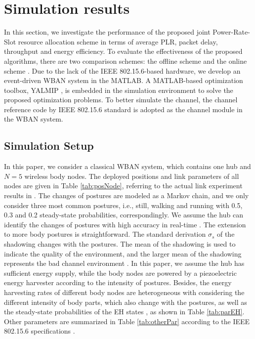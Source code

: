 \documentclass[journal,10pt]{IEEEtran}
\begin{document}
\section{Simulation results} \label{sec:simulation}
In this section, we investigate the performance of the proposed joint Power-Rate-Slot resource allocation scheme in terms of average PLR, packet delay, throughput and energy efficiency.
To evaluate the effectiveness of the proposed algorithms, there are two comparison schemes: the offline scheme \cite{huang2014optimal} and the online scheme \cite{ibarra2016qos}.
Due to the lack of the IEEE 802.15.6-based hardware, we develop an event-driven WBAN system in the MATLAB. A MATLAB-based optimization toolbox, YALMIP \cite{lofberg2004yalmip}, is embedded in the simulation environment to solve the proposed optimization problems. To better simulate the channel, the channel reference code by IEEE 802.15.6 standard \cite{yazdandoost2009channel} is adopted as the channel module in the WBAN system.

\subsection{Simulation Setup}
In this paper, we consider a classical WBAN system, which contains one hub and $N=5$ wireless body nodes. The deployed positions and link parameters of all nodes are given in Table \ref{tab:posNode}, referring to the actual link experiment results in \cite{d2010statistical} \cite{reusens2009characterization}. The changes of postures are modeled as a Markov chain, and we only consider three most common postures, i.e., still, walking and running with 0.5, 0.3 and 0.2 steady-state probabilities, correspondingly. We assume the hub can identify the changes of postures with high accuracy in real-time \cite{guo2016two}. The extension to more body postures is straightforward. 
The standard derivation $\sigma_{s}$ of the shadowing changes with the postures. The mean of the shadowing is used to indicate the quality of the environment, and the larger mean of the shadowing represents the bad channel environment \cite{d2010statistical}. 
In this paper, we assume the hub has sufficient energy supply, while the body nodes are powered by a piezoelectric energy harvester according to the intensity of postures. Besides, the energy harvesting rates of different body nodes are heterogeneous with considering the different intensity of body parts, which also change with the postures, as well as the steady-state probabilities of the EH states \cite{ibarra2016qos}, as shown in Table \ref{tab:parEH}. Other parameters are summarized in Table \ref{tab:otherPar} according to the IEEE 802.15.6 specifications \cite{ieee2012WBAN}. 
\end{document}
